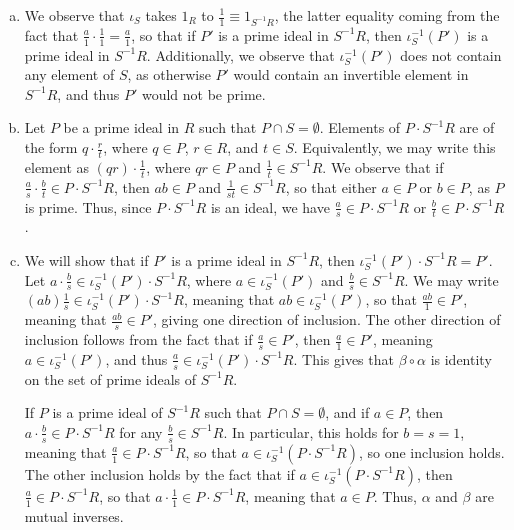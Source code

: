 \documentclass[10pt]{mypackage}
\begin{document}
\begin{solution}\hfill
  \begin{enumerate}[(a)]
    \item We observe that $\iota_S$ takes $1_{R}$ to $\frac{1}{1}\equiv 1_{S^{-1}R}$, the latter equality coming from the fact that $ \frac{a}{1} \cdot \frac{1}{1} = \frac{a}{1} $, so that if $P'$ is a prime ideal in $S^{-1}R$, then $\iota_S^{-1}\left( P' \right)$ is a prime ideal in $S^{-1}R$. Additionally, we observe that $\iota_S^{-1}\left( P' \right)$ does not contain any element of $S$, as otherwise $P'$ would contain an invertible element in $S^{-1}R$, and thus $P'$ would not be prime.
    \item Let $P$ be a prime ideal in $R$ such that $P\cap S = \emptyset$. Elements of $P\cdot S^{-1}R$ are of the form $q \cdot \frac{r}{t}$, where $q\in P$, $r\in R$, and $ t\in S $. Equivalently, we may write this element as $ \left( qr \right)\cdot \frac{1}{t} $, where $qr\in P$ and $ \frac{1}{t}\in S^{-1}R $. We observe that if $ \frac{a}{s}\cdot \frac{b}{t}\in P\cdot S^{-1}R $, then $ ab\in P $ and $ \frac{1}{st}\in S^{-1}R $, so that either $a\in P$ or $b\in P$, as $P$ is prime. Thus, since $P\cdot S^{-1}R$ is an ideal, we have $ \frac{a}{s}\in P\cdot S^{-1}R $ or $ \frac{b}{t}\in P\cdot S^{-1}R $.
    \item We will show that if $P'$ is a prime ideal in $S^{-1}R$, then $\iota_{S}^{-1}\left( P' \right)\cdot S^{-1}R = P'$. Let $a\cdot \frac{b}{s}\in \iota_{S}^{-1}\left( P' \right)\cdot S^{-1}R$, where $a\in \iota_{S}^{-1}\left( P' \right)$ and $\frac{b}{s}\in S^{-1}R$. We may write $\left( ab \right)\frac{1}{s}\in \iota_{S}^{-1}\left( P' \right)\cdot S^{-1}R$, meaning that $ab\in \iota_{S}^{-1}\left( P' \right)$, so that $\frac{ab}{1}\in P'$, meaning that $\frac{ab}{s}\in P'$, giving one direction of inclusion. The other direction of inclusion follows from the fact that if $\frac{a}{s}\in P'$, then $ \frac{a}{1}\in P' $, meaning $a\in \iota_{S}^{-1}\left( P' \right)$, and thus $\frac{a}{s}\in \iota_{S}^{-1}\left( P' \right)\cdot S^{-1}R$. This gives that $\beta\circ \alpha$ is identity on the set of prime ideals of $S^{-1}R$.\newline

      If $P$ is a prime ideal of $S^{-1}R$ such that $P\cap S = \emptyset$, and if $a\in P$, then $ a \cdot \frac{b}{s}\in P\cdot S^{-1}R $ for any $\frac{b}{s}\in S^{-1}R$. In particular, this holds for $ b = s = 1 $, meaning that $ \frac{a}{1}\in P\cdot S^{-1}R $, so that $ a\in \iota_{S}^{-1}\left( P\cdot S^{-1}R \right) $, so one inclusion holds. The other inclusion holds by the fact that if $ a\in \iota_{S}^{-1}\left( P\cdot S^{-1}R \right) $, then $\frac{a}{1}\in P\cdot S^{-1}R$, so that $ a\cdot \frac{1}{1}\in P\cdot S^{-1}R $, meaning that $ a\in P $. Thus, $\alpha$ and $\beta$ are mutual inverses.
  \end{enumerate}
\end{solution}
\end{document}
